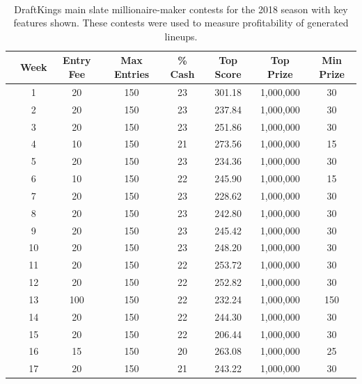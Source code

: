 \documentclass[12pt]{article}
\begin{document}
﻿\begin{table}[H]
\caption{DraftKings main slate millionaire-maker contests for the 2018 season with key features shown. These contests were used to measure profitability of generated lineups.}
\centering
\begin{tabular}{lccccccc}
\toprule
{} &  Week &  Entry Fee &  Max Entries &  \% Cash &  Top Score &   Top Prize &  Min Prize \\
\midrule
{} &     1 &      20 &       150 &   23 &    301.18 &  1,000,000 &      30 \\
{} &     2 &      20 &       150 &   23 &    237.84 &  1,000,000 &      30 \\
{} &     3 &      20 &       150 &   23 &    251.86 &  1,000,000 &      30 \\
{} &     4 &      10 &       150 &   21 &    273.56 &  1,000,000 &      15 \\
{} &     5 &      20 &       150 &   23 &    234.36 &  1,000,000 &      30 \\
{} &     6 &      10 &       150 &   22 &    245.90 &  1,000,000 &      15 \\
{} &     7 &      20 &       150 &   23 &    228.62 &  1,000,000 &      30 \\
{} &     8 &      20 &       150 &   23 &    242.80 &  1,000,000 &      30 \\
{} &     9 &      20 &       150 &   23 &    245.42 &  1,000,000 &      30 \\
{} &    10 &      20 &       150 &   23 &    248.20 &  1,000,000 &      30 \\
{} &    11 &      20 &       150 &   22 &    253.72 &  1,000,000 &      30 \\
{} &    12 &      20 &       150 &   22 &    252.82 &  1,000,000 &      30 \\
{} &    13 &     100 &       150 &   22 &    232.24 &  1,000,000 &     150 \\
{} &    14 &      20 &       150 &   22 &    244.30 &  1,000,000 &      30 \\
{} &    15 &      20 &       150 &   22 &    206.44 &  1,000,000 &      30 \\
{} &    16 &      15 &       150 &   20 &    263.08 &  1,000,000 &      25 \\
{} &    17 &      20 &       150 &   21 &    243.22 &  1,000,000 &      30 \\
\bottomrule
\end{tabular}
\label{weekly_contests}
\end{table}
\end{document}
